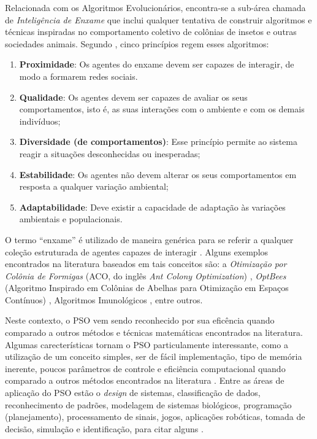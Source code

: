 \documentclass[
	12pt,				%
	openany,			%
	oneside,	
	a4paper,			%
	brazil,				%
	]{unimontes-ppgmsc-abntex2}
\begin{document}
Relacionada com os Algoritmos Evolucionários, encontra-se a sub-área chamada de {\em Inteligência de Enxame} que inclui qualquer tentativa de construir algoritmos e técnicas inspiradas no comportamento coletivo de colônias de insetos e outras sociedades animais. Segundo , cinco princípios regem esses algoritmos:

\begin{enumerate}[label=(\roman*)]
\item \textbf{Proximidade}: Os agentes do enxame devem ser capazes de interagir, de modo a formarem redes sociais.
\item \textbf{Qualidade}: Os agentes devem ser capazes de avaliar os seus comportamentos, isto é, as suas interações com o ambiente e com os demais indivíduos;
\item \textbf{Diversidade (de comportamentos)}: Esse princípio permite ao sistema reagir a situações desconhecidas ou inesperadas;
\item \textbf{Estabilidade}: Os agentes não devem  alterar os seus comportamentos em resposta a qualquer variação ambiental;
\item \textbf{Adaptabilidade}: Deve existir a capacidade de adaptação às variações ambientais e populacionais.
\end{enumerate}

O termo ``enxame'' é utilizado de maneira genérica para se  referir a qualquer coleção estruturada de agentes capazes de interagir \cite{VonZuben_2007}. Alguns exemplos encontrados na literatura baseados em tais conceitos são: a {\em Otimização por Colônia de Formigas} (ACO, do inglês {\em Ant Colony Optimization}) \cite{Dorigo_1996}, {\em OptBees} (Algoritmo Inspirado em Colônias de Abelhas para Otimização em Espaços Contínuos) \cite{Renato_2013}, Algoritmos Imunológicos \cite{Castro_2002}, entre outros. 

Neste contexto, o PSO vem sendo reconhecido por sua eficência quando comparado a outros métodos e técnicas matemáticas encontrados na literatura. Algumas carecterísticas tornam o PSO particulamente interessante, como a utilização de um conceito simples, ser de fácil implementação, tipo de memória inerente, poucos parâmetros de controle e eficiência computacional quando comparado a outros métodos encontrados na literatura \cite{Valle_2008}. Entre as áreas de aplicação do PSO estão o {\em design} de sistemas, classificação de dados, reconhecimento de padrões, modelagem de sistemas biológicos, programação (planejamento), processamento de sinais, jogos, aplicações robóticas, tomada de decisão, simulação e identificação, para citar alguns \cite{Kennedy_2001}.
  
\end{document}
